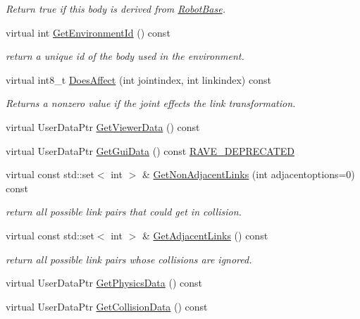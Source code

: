 \begin{DoxyCompactItemize}
\begin{DoxyCompactList}\small\item\em Return true if this body is derived from \hyperlink{classOpenRAVE_1_1RobotBase}{RobotBase}. \item\end{DoxyCompactList}\item 
virtual int \hyperlink{classOpenRAVE_1_1KinBody_a51f880cf26774cd34ab9634bd518b955}{GetEnvironmentId} () const 
\begin{DoxyCompactList}\small\item\em return a unique id of the body used in the environment. \item\end{DoxyCompactList}\item 
virtual int8\_\-t \hyperlink{classOpenRAVE_1_1KinBody_ae63c68d8042f54cfb86ef6b52827cb69}{DoesAffect} (int jointindex, int linkindex) const 
\begin{DoxyCompactList}\small\item\em Returns a nonzero value if the joint effects the link transformation. \item\end{DoxyCompactList}\item 
virtual UserDataPtr \hyperlink{classOpenRAVE_1_1KinBody_afb0f7064845ec4978785c8973be539ee}{GetViewerData} () const 
\item 
virtual UserDataPtr \hyperlink{classOpenRAVE_1_1KinBody_ab57d127f75d79fb8bb00524894de8453}{GetGuiData} () const \hyperlink{namespaceOpenRAVE_af23fc4c2c72950a8c02f38ef71680bc6}{RAVE\_\-DEPRECATED}
\item 
virtual const std::set$<$ int $>$ \& \hyperlink{classOpenRAVE_1_1KinBody_a0dfdf7668c68c2860a27983804e90c8b}{GetNonAdjacentLinks} (int adjacentoptions=0) const 
\begin{DoxyCompactList}\small\item\em return all possible link pairs that could get in collision. \item\end{DoxyCompactList}\item 
\hypertarget{classOpenRAVE_1_1KinBody_afe1545b1bf9bfd1f76ce88e53e0914e7}{
virtual const std::set$<$ int $>$ \& \hyperlink{classOpenRAVE_1_1KinBody_afe1545b1bf9bfd1f76ce88e53e0914e7}{GetAdjacentLinks} () const }
\label{classOpenRAVE_1_1KinBody_afe1545b1bf9bfd1f76ce88e53e0914e7}

\begin{DoxyCompactList}\small\item\em return all possible link pairs whose collisions are ignored. \item\end{DoxyCompactList}\item 
virtual UserDataPtr \hyperlink{classOpenRAVE_1_1KinBody_abeee587581232f14ea57e9f05b740779}{GetPhysicsData} () const 
\item 
\hypertarget{classOpenRAVE_1_1KinBody_a4ae94c3cbd134d68a476d4362d2a250f}{
virtual UserDataPtr \hyperlink{classOpenRAVE_1_1KinBody_a4ae94c3cbd134d68a476d4362d2a250f}{GetCollisionData} () const }
\label{classOpenRAVE_1_1KinBody_a4ae94c3cbd134d68a476d4362d2a250f}


\end{DoxyCompactItemize}
